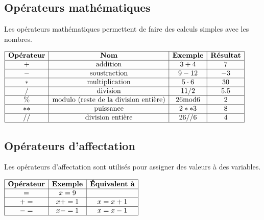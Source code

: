 \documentclass[a4paper,11pt]{article}
\begin{document}
\subsection{Opérateurs mathématiques}
Les opérateurs mathématiques permettent de faire des calculs simples avec les nombres.\par
\begin{center}
$\begin{array}{|c|c|c|c|}
\hline
\textbf{Opérateur} & \textbf{Nom} & \textbf{Exemple} & \textbf{Résultat} \\
\hline
+ & \text{addition} & 3 + 4 & 7\\
\hline
- & \text{soustraction} & 9 - 12 & -3\\
\hline
* & \text{multiplication} & 5 \cdot 6 & 30\\
\hline
/ & \text{division} & 11 / 2 & 5.5\\
\hline
\% & \text{modulo (reste de la division entière)} & 26 \text{mod} 6 & 2\\
\hline
** & \text{puissance} & 2**3 & 8\\
\hline
// & \text{division entière} & 26 // 6 & 4\\
\hline
\end{array}$
\end{center}

\subsection{Opérateurs d'affectation}
Les opérateurs d'affectation sont utilisés pour assigner des valeurs à des variables.\par
\begin{center}
$\begin{array}{|c|c|c|}
\hline
\textbf{Opérateur} & \textbf{Exemple} & \textbf{Équivalent à} \\
\hline
= & x = 9 & \\
\hline
+= & x += 1 & x = x + 1\\
\hline
-= & x -= 1 & x = x -1\\
\hline
\end{array}$
\end{center}
\end{document}
